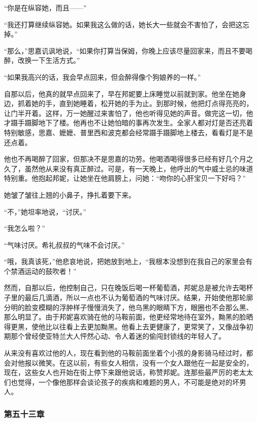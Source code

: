 \par “你是在纵容她，而且——”
\par “我还打算继续纵容她。如果我这么做的话，她长大一些就会不害怕了，会把这忘掉。”
\par “那么，”思嘉讥讽地说，“如果你打算当保姆，你晚上应该尽量回家来，而且不要喝醉，改换一下生活方式。”
\par “如果我高兴的话，我会早点回来，但会醉得像个狗娘养的一样。”
\par 自那以后，他真的就早点回来了，早在邦妮要上床睡觉以前就到家。他坐在她身边，抓着她的手，直到她睡着，松开她的手为止。到那时候，他把灯点得亮亮的，让门半开着。这样，万一她醒过来害怕了，他也听得见她的声音。做完这一切，他才蹑手蹑脚地下了楼。他再也不让她怕暗的事再次发生。全家人都对灯是否还亮着特别敏感，思嘉、嬷嬷、普里西和波克都会经常蹑手蹑脚地上楼去，看看灯是不是还点着。
\par 他也不再喝醉了回家，但那决不是思嘉的功劳。他喝酒喝得很多已经有好几个月之久了，虽然他从来没有真正醉过。可是，有一天晚上，他呼出的气中威士忌的味道特别重。他抱起邦妮，让她坐在他肩膀上，问她：“吻你的心肝宝贝一下好吗？”
\par 她皱了皱往上翘的小鼻子，挣扎着要下来。
\par “不，”她坦率地说，“讨厌。”
\par “我怎么啦？”
\par “气味讨厌。希礼叔叔的气味不会讨厌。”
\par “哦，我真该死，”他悲哀地说，把她放到地上，“我根本没想到在我自己的家里会有个禁酒运动的鼓吹者！”
\par 然而，自那以后，他控制自己，只在晚饭后喝一杯葡萄酒，邦妮总是被允许去喝杯子里的最后几滴酒，所以一点也不认为葡萄酒的气味讨厌。结果，开始使他那轮廓分明的脸变模糊的浮肿样子慢慢消失了，他乌黑的眼睛下方，眼圈也不会那么黑、那么明显了。由于邦妮喜欢骑在他的马鞍前面，他更经常地待在室外，黝黑的脸晒得更黑，使他比以往看上去更加黝黑。他看上去更健康了，更常笑了，又像战争初期那个曾经使亚特兰大人怦然心动、令人着迷的偷闯封锁线的年轻人了。
\par 从来没有喜欢过他的人，现在看到他的马鞍前面坐着个小孩的身影骑马经过时，都会对他报以微笑。在这以前，有些女人相信，没有一个女人跟他在一起是安全的，现在，这些女人也开始在街上停下来跟他说话，称赞邦妮。连那些最严厉的老太太们也觉得，一个像他那样会谈论孩子的疾病和难题的男人，不可能是绝对的坏男人。

\subsubsection{第五十三章}

